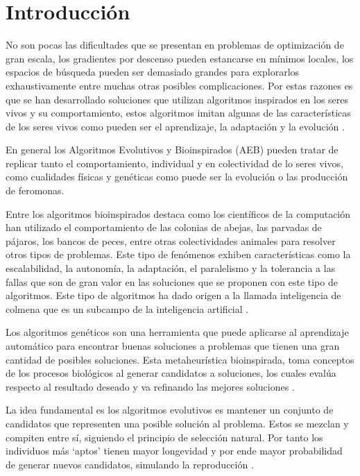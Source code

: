 \documentclass[twocolumn,spanish]{revtex4-1}
\begin{document}
\section{Introducción}

No son pocas las dificultades que se presentan en problemas de optimización de gran escala, los gradientes por descenso pueden estancarse en mínimos locales, los espacios de búsqueda pueden ser demasiado grandes para explorarlos exhaustivamente entre muchas otras posibles complicaciones. Por estas razones es que se han desarrollado soluciones que utilizan algoritmos inspirados en los seres vivos y su comportamiento, estos algoritmos imitan algunas de las características de los seres vivos como pueden ser el aprendizaje, la adaptación y la evolución \cite{krishnanand2009comparative}.

En general los Algoritmos Evolutivos y Bioinspirados (AEB) pueden tratar de replicar tanto el comportamiento, individual y en colectividad de lo seres vivos, como cualidades físicas y genéticas como puede ser la evolución o las producción de feromonas.

Entre los algoritmos bioinspirados destaca como los científicos de la computación han utilizado el comportamiento de las colonias de abejas, las parvadas de pájaros, los bancos de peces, entre otras colectividades animales para resolver otros tipos de problemas. Este tipo de fenómenos exhiben características como la escalabilidad, la autonomía, la adaptación, el paralelismo y la tolerancia a las fallas que son de gran valor en las soluciones que se proponen con este tipo de algoritmos. Este tipo de algoritmos ha dado origen a la llamada inteligencia de colmena que es un subcampo de la inteligencia artificial \cite{darwish2018bio}.

Los algoritmos genéticos son una herramienta que puede aplicarse al aprendizaje automático para encontrar buenas soluciones a problemas que tienen una gran cantidad de posibles soluciones. Esta metaheurística bioinspirada, toma conceptos de los procesos biológicos al generar candidatos a soluciones, los cuales evalúa respecto al resultado deseado y va refinando las mejores soluciones \cite{sheppard}.

La idea fundamental es los algoritmos evolutivos es mantener un conjunto de candidatos que representen una posible solución al problema. Estos se mezclan y compiten entre sí, siguiendo el principio de selección natural. Por tanto los individuos más `aptos’ tienen mayor longevidad y por ende mayor probabilidad de generar nuevos candidatos, simulando la reproducción \cite{Andaluz}.
\end{document}
